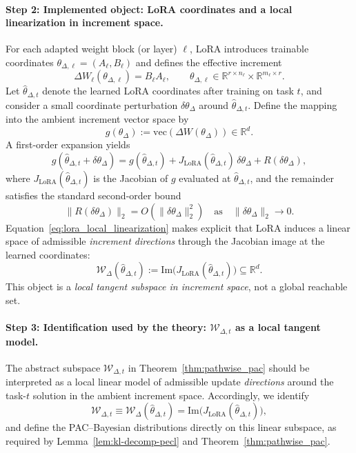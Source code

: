 \documentclass{article}
\theoremstyle{plain}
\theoremstyle{definition}
\theoremstyle{remark}
\begin{document}
\paragraph{Step 2: Implemented object: LoRA coordinates and a local linearization in increment space.}
For each adapted weight block (or layer) $\ell$, LoRA introduces trainable coordinates
$\theta_{\Delta,\ell}=(A_\ell,B_\ell)$ and defines the effective increment
\[
\Delta W_\ell(\theta_{\Delta,\ell}) = B_\ell A_\ell ,
\qquad
\theta_{\Delta,\ell}\in\mathbb R^{r\times n_\ell}\times\mathbb R^{m_\ell\times r}.
\]
Let $\hat\theta_{\Delta,t}$ denote the learned LoRA coordinates after training on task $t$,
and consider a small coordinate perturbation $\delta\theta_\Delta$ around $\hat\theta_{\Delta,t}$.
Define the mapping into the ambient increment vector space by
\[
g(\theta_\Delta) := \mathrm{vec}(\Delta W(\theta_\Delta))\in\mathbb R^d.
\]
A first-order expansion yields
\begin{equation}
\label{eq:lora_local_linearization}
g(\hat\theta_{\Delta,t}+\delta\theta_\Delta)
=
g(\hat\theta_{\Delta,t})
+
J_{\mathrm{LoRA}}(\hat\theta_{\Delta,t})\,\delta\theta_\Delta
+
R(\delta\theta_\Delta),
\end{equation}
where $J_{\mathrm{LoRA}}(\hat\theta_{\Delta,t})$ is the Jacobian of $g$ evaluated at $\hat\theta_{\Delta,t}$,
and the remainder satisfies the standard second-order bound
\[
\|R(\delta\theta_\Delta)\|_2 = O(\|\delta\theta_\Delta\|_2^2)
\quad\text{as}\quad
\|\delta\theta_\Delta\|_2\to 0.
\]
Equation~\eqref{eq:lora_local_linearization} makes explicit that LoRA induces a linear space of admissible
\emph{increment directions} through the Jacobian image at the learned coordinates:
\begin{equation}
\label{eq:WDelta_Jacobian_image_new}
\mathcal W_{\Delta}(\hat\theta_{\Delta,t})
:=
\mathrm{Im}\!\big(J_{\mathrm{LoRA}}(\hat\theta_{\Delta,t})\big)
\subseteq \mathbb R^d .
\end{equation}
This object is a \emph{local tangent subspace in increment space}, not a global reachable set.

\paragraph{Step 3: Identification used by the theory: $\mathcal W_{\Delta,t}$ as a local tangent model.}
The abstract subspace $\mathcal W_{\Delta,t}$ in Theorem~\ref{thm:pathwise_pac} should be interpreted as
a local linear model of admissible update \emph{directions} around the task-$t$ solution in the ambient
increment space. Accordingly, we identify
\begin{equation}
\label{eq:WDelta_t_identification}
\mathcal W_{\Delta,t}
\equiv
\mathcal W_{\Delta}(\hat\theta_{\Delta,t})
=
\mathrm{Im}\!\big(J_{\mathrm{LoRA}}(\hat\theta_{\Delta,t})\big),
\end{equation}
and define the PAC--Bayesian distributions directly on this linear subspace, as required by
Lemma~\ref{lem:kl-decomp-pecl} and Theorem~\ref{thm:pathwise_pac}.
\end{document}
